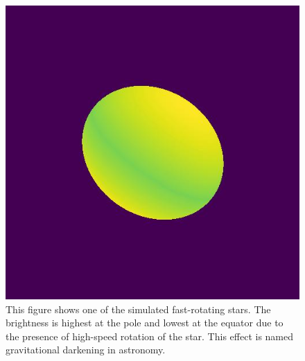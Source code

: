 \begin{figure}
	\centering
	\includegraphics[width=0.8\linewidth]{fig/ellipse/ellipse6018.jpg}
	\caption{This figure shows one of the simulated fast-rotating stars. The brightness is highest at the pole and lowest at the equator due to the presence of high-speed rotation of the star. This effect is named gravitational darkening in astronomy.}
	\label{fig:image}
\end{figure}
